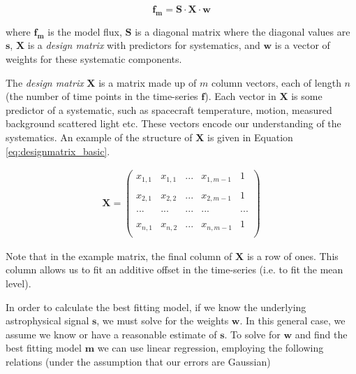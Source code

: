\documentclass[iop]{emulateapj}
\begin{document}
\begin{equation}
    \label{eq:model}
    \mathbf{f_m} = \mathbf{S} \cdot \mathbf{X} \cdot {\mathbf{w}}
\end{equation}

where $\mathbf{f_m}$ is the model flux, $\mathbf{S}$ is a diagonal matrix where the diagonal values are $\mathbf{s}$, $\mathbf{X}$ is a \emph{design matrix} with predictors for systematics, and $\mathbf{w}$ is a vector of weights for these systematic components.

The \emph{design matrix} $\mathbf{X}$ is a matrix made up of $m$ column vectors, each of length $n$ (the number of time points in the time-series $\mathbf{f}$). Each vector in $\mathbf{X}$ is some predictor of a systematic, such as spacecraft temperature, motion, measured background scattered light etc. These vectors encode our understanding of the systematics. An example of the structure of $\mathbf{X}$ is given in Equation \ref{eq:designmatrix_basic}.

\begin{align}
\label{eq:designmatrix_basic}
\mathbf{X} =  \begin{pmatrix}
              x_{1,1} & x_{1,1} & ... & x_{1,m - 1} & 1\\
              \\
              x_{2,1} & x_{2,2} & ... & x_{2,m - 1} & 1\\
              \\
              ... & ... & ... & ... & ...\\
              \\
              x_{n,1} & x_{n,2} & ... & x_{n,m - 1} & 1\\
              \end{pmatrix}
\end{align}

Note that in the example matrix, the final column of $\mathbf{X}$ is a row of ones. This column allows us to fit an additive offset in the time-series (i.e. to fit the mean level).

In order to calculate the best fitting model, if we know the underlying astrophysical signal $\mathbf{s}$, we must solve for the weights $\mathbf{w}$. In this general case, we assume we know or have a reasonable estimate of $\mathbf{s}$. To solve for $\mathbf{w}$ and find the best fitting model $\mathbf{m}$ we can use linear regression, employing the following relations (under the assumption that our errors are Gaussian)
\end{document}
